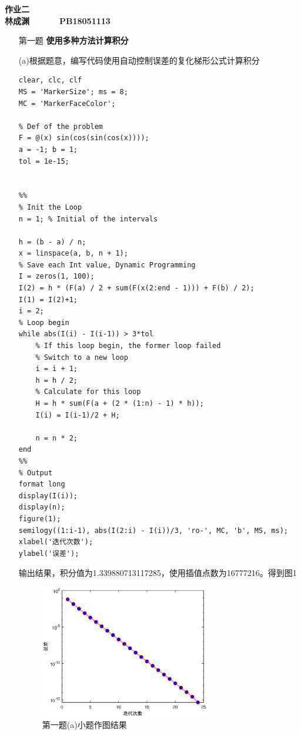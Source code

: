 \documentclass[12pt,a4paper,utf8]{ctexart}
\begin{document}


\begin{center}
\textbf{作业二}\\
\textbf{林成渊 ~~~~~ PB18051113 ~~~~~ \zhtoday}\\
\end{center}
\textit{}
\vspace{\baselineskip}

\begin{enumerate}
\item[第一题] \textbf{使用多种方法计算积分}

(a)根据题意，编写代码使用自动控制误差的复化梯形公式计算积分
\begin{lstlisting}[frame=single]
clear, clc, clf
MS = 'MarkerSize'; ms = 8;
MC = 'MarkerFaceColor';

% Def of the problem
F = @(x) sin(cos(sin(cos(x))));
a = -1; b = 1;
tol = 1e-15;


%%
% Init the Loop
n = 1; % Initial of the intervals

h = (b - a) / n;
x = linspace(a, b, n + 1);
% Save each Int value, Dynamic Programming
I = zeros(1, 100);
I(2) = h * (F(a) / 2 + sum(F(x(2:end - 1))) + F(b) / 2);
I(1) = I(2)+1;
i = 2;
% Loop begin
while abs(I(i) - I(i-1)) > 3*tol
    % If this loop begin, the former loop failed
    % Switch to a new loop
    i = i + 1;
    h = h / 2; 
    % Calculate for this loop
    H = h * sum(F(a + (2 * (1:n) - 1) * h));
    I(i) = I(i-1)/2 + H;
    
    n = n * 2;
end
%%
% Output
format long
display(I(i));
display(n);
figure(1);
semilogy((1:i-1), abs(I(2:i) - I(i))/3, 'ro-', MC, 'b', MS, ms);
xlabel('迭代次数');
ylabel('误差');
\end{lstlisting}
输出结果，积分值为1.339880713117285，使用插值点数为16777216。得到图1
\begin{figure}[htbp]
    \centering
    \includegraphics[width=0.7\textwidth]{image/T1_a.eps}
    \caption{第一题(a)小题作图结果}
\end{figure}


\end{enumerate}
\end{document}
